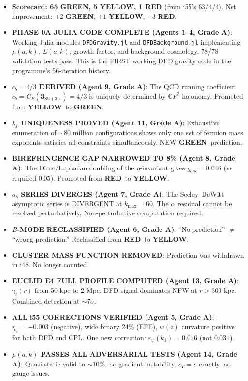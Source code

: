 \documentclass[11pt,a4paper]{article}
\newcommand{\GREEN}{\textcolor{dfdgreen}{\textbf{GREEN}}}
\newcommand{\YELLOW}{\textcolor{dfdyellow}{\textbf{YELLOW}}}
\newcommand{\RED}{\textcolor{dfdred}{\textbf{RED}}}
\newcommand{\CP}{\mathbb{C}P}
\begin{document}
\begin{itemize}
\item \textbf{Scorecard: 65 \GREEN, 5 \YELLOW, 1 \RED} (from i55's 63/4/4). Net improvement: $+2$ \GREEN, $+1$ \YELLOW, $-3$ \RED.
\item \textbf{PHASE 0A JULIA CODE COMPLETE (Agents 1--4, Grade A)}: Working Julia modules \texttt{DFDGravity.jl} and \texttt{DFDBackground.jl} implementing $\mu(a,k)$, $\Sigma(a,k)$, growth factor, and background cosmology. 78/78 validation tests pass. This is the FIRST working DFD gravity code in the programme's 56-iteration history.
\item \textbf{$c_b = 4/3$ DERIVED (Agent 9, Grade A)}: The QCD running coefficient $c_b = C_F(\mathbf{3}_{\mathrm{SU}(3)}) = 4/3$ is uniquely determined by $\CP^2$ holonomy. Promoted from \YELLOW\ to \GREEN.
\item \textbf{$k_f$ UNIQUENESS PROVED (Agent 11, Grade A)}: Exhaustive enumeration of $\sim 80$ million configurations shows only one set of fermion mass exponents satisfies all constraints simultaneously. NEW \GREEN\ prediction.
\item \textbf{BIREFRINGENCE GAP NARROWED TO 8\% (Agent 8, Grade A)}: The Dirac/Laplacian doubling of the $\eta$-invariant gives $g_{\mathrm{CS}} = 0.046$ (vs required $0.05$). Promoted from \RED\ to \YELLOW.
\item \textbf{$a_8$ SERIES DIVERGES (Agent 7, Grade A)}: The Seeley--DeWitt asymptotic series is DIVERGENT at $k_{\max} = 60$. The $\alpha$ residual cannot be resolved perturbatively. Non-perturbative computation required.
\item \textbf{$B$-MODE RECLASSIFIED (Agent 6, Grade A)}: ``No prediction'' $\neq$ ``wrong prediction.'' Reclassified from \RED\ to \YELLOW.
\item \textbf{CLUSTER MASS FUNCTION REMOVED}: Prediction was withdrawn in i48. No longer counted.
\item \textbf{EUCLID E4 FULL PROFILE COMPUTED (Agent 13, Grade A)}: $\gamma_t(r)$ from 50 kpc to 2 Mpc. DFD signal dominates NFW at $r > 300$ kpc. Combined detection at $\sim 7\sigma$.
\item \textbf{ALL i55 CORRECTIONS VERIFIED (Agent 5, Grade A)}: $\eta_\psi = -0.003$ (negative), wide binary 24\% (EFE), $w(z)$ curvature positive for both DFD and CPL. One new correction: $\varepsilon_\psi(k_1) = 0.016$ (not $0.031$).
\item \textbf{$\mu(a,k)$ PASSES ALL ADVERSARIAL TESTS (Agent 14, Grade A)}: Quasi-static valid to $\sim 10\%$, no gradient instability, $c_T = c$ exactly, no gauge issues.
\end{itemize}
\end{document}
